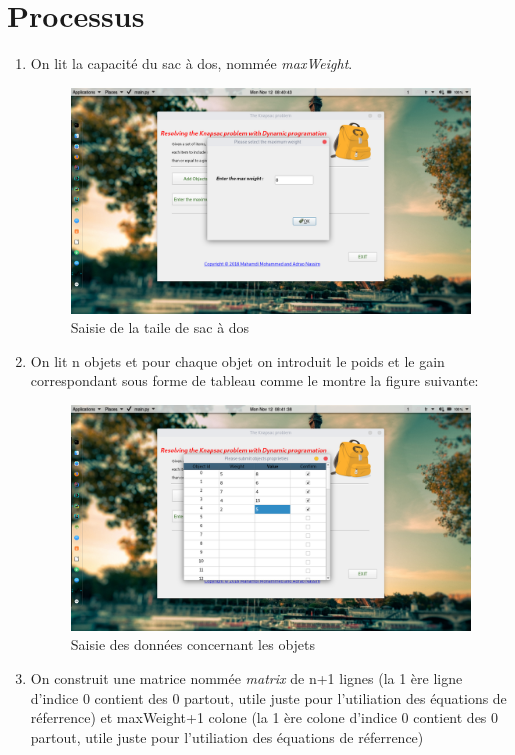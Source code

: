 \documentclass[12pt]{report}
\begin{document}
	\section{Processus}\begin{enumerate}
		\item On lit la capacité du sac à dos, nommée \emph{maxWeight}.
		\begin{figure}[h!]
	\centering
	\includegraphics[scale=1, width=18cm]{../screenshots/2.png}
	\caption{Saisie de la taile de sac à dos}	
	\end{figure}
\FloatBarrier
		\item On lit n objets et pour chaque objet on introduit le poids et le gain correspondant sous forme de tableau comme le montre la figure suivante:
			\begin{figure}[h!]
	\centering
	\includegraphics[scale=1, width=18cm]{../screenshots/3.png}
	\caption{Saisie des données concernant les objets}
	\end{figure}
	\FloatBarrier
		\item On construit une matrice nommée \emph{matrix} de n+1 lignes (la 1 ère ligne d'indice 0 contient des 0 partout, utile juste pour l'utiliation des équations de réferrence) et maxWeight+1 colone (la 1 ère colone d'indice 0 contient des 0 partout, utile juste pour l'utiliation des équations de réferrence)

\end{enumerate}
\end{document}
